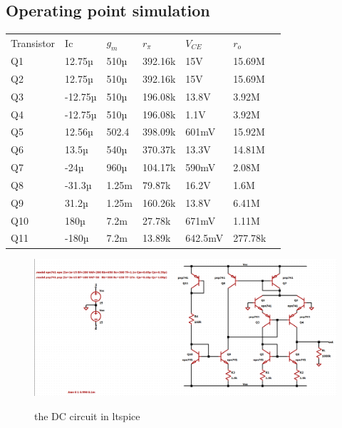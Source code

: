\documentclass[11pt]{article}
\begin{document}
\subsection{Operating point simulation}
\begin{table}[H]
    \begin{tabular}{lllllll}
    Transistor & Ic      & $g_m$     & $r_\pi$ & $V_{CE}$  & $r_o$      \\
    Q1         & 12.75µ  & 510µ   & 392.16k & 15V & 15.69M  \\
    Q2         & 12.75µ  & 510µ   & 392.16k & 15V & 15.69M  \\
    Q3         & -12.75µ & 510µ   & 196.08k & 13.8V & 3.92M   \\
    Q4         & -12.75µ & 510µ   & 196.08k & 1.1V & 3.92M   \\
    Q5         & 12.56µ  & 502.4  & 398.09k & 601mV & 15.92M  \\
    Q6         & 13.5µ   & 540µ   & 370.37k & 13.3V & 14.81M  \\
    Q7         & -24µ    & 960µ   & 104.17k & 590mV & 2.08M   \\
    Q8         & -31.3µ  & 1.25m  & 79.87k  & 16.2V & 1.6M    \\
    Q9         & 31.2µ   & 1.25m  & 160.26k & 13.8V & 6.41M   \\
    Q10        & 180µ    & 7.2m   & 27.78k  & 671mV & 1.11M   \\
    Q11        & -180µ   & 7.2m   & 13.89k  & 642.5mV & 277.78k
    \end{tabular}
\end{table}
\begin{figure}[H]
    \begin{center}
        \includegraphics[scale=0.4]{Fig/dc-circuit.png}
        \label{fig:dcCircuit}
        \caption{the DC circuit in ltspice}
    \end{center}
\end{figure}
\end{document}
